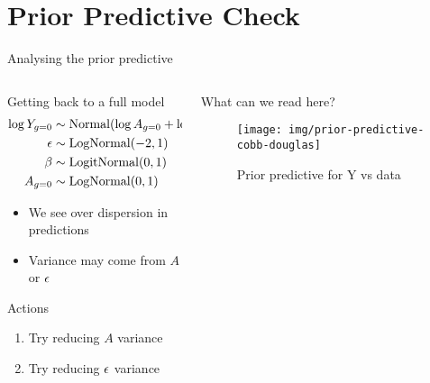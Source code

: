 \documentclass{beamer}
\begin{document}
\section{Prior Predictive Check}
\begin{frame}{Analysing the prior predictive}
    \begin{columns}
\begin{column}{0.6\linewidth}
Getting back to a full model 
\begin{align*}
    \log Y_{g=0} &\sim \operatorname{Normal}(\log A_{g=0} + \log L \cdot \beta, {\epsilon})\\
    {\epsilon} &\sim \operatorname{LogNormal}(-2, 1)\\
    \beta &\sim \operatorname{LogitNormal}(0, 1)\\
    A_{g=0} &\sim \operatorname{LogNormal}(0, 1)\\
\end{align*}
\begin{itemize}
    \item We see over dispersion in predictions
    \item Variance may come from $A$ or ${\epsilon}$
\end{itemize}
\begin{block}{Actions}
\begin{enumerate}
    \item Try reducing $A$ variance
    \item Try reducing ${\epsilon}$ variance
\end{enumerate}
\end{block}
\end{column}
\begin{column}{0.4\linewidth}
What can we read here?
\begin{figure}
   \centering
   \texttt{[image: img/prior-predictive-cobb-douglas]}
   \caption{Prior predictive for Y vs data}
\end{figure}
\end{column}
\end{columns}
\end{frame}
\end{document}
